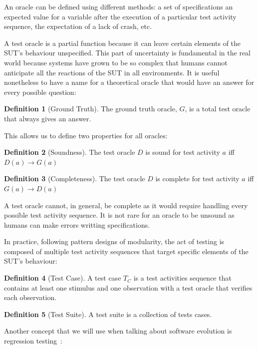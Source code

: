 \documentclass[11pt]{sdm_internship}
\theoremstyle{definition}
\newtheorem{definition}{Definition}[section]
\begin{document}
An oracle can be defined using different methods: a set of specifications an expected value for a variable after the execution of a particular test activity sequence, the expectation of a lack of crash, etc.

A test oracle is a partial function because it can leave certain elements of the SUT's behaviour unspecified.
This part of uncertainty is fundamental in the real world because systems have grown to be so complex that humans cannot anticipate all the reactions of the SUT in all environments.
It is useful nonetheless to have a name for a theoretical oracle that would have an answer for every possible question:

\begin{definition}[Ground Truth]
  The ground truth oracle, $G$, is a total test oracle that always gives an answer.
\end{definition}

This allows us to define two properties for all oracles:

\begin{definition}[Soundness]
  The test oracle $D$ is sound for test activity $a$ iff $D(a) \rightarrow G(a)$
\end{definition}
\begin{definition}[Completeness]
  The test oracle $D$ is complete for test activity $a$ iff $G(a) \rightarrow D(a)$
\end{definition}

A test oracle cannot, in general, be complete as it would require handling every possible test activity sequence.
It is not rare for an oracle to be unsound as humans can make errors writting specifications.

In practice, following pattern designs of modularity, the act of testing is composed of multiple test activity sequences that target specific elements of the SUT's behaviour:

\begin{definition}[Test Case]
  A test case $T_C$ is a test activities sequence that contains at least one stimulus and one observation with a test oracle that verifies each observation.
\end{definition}
\begin{definition}[Test Suite]
  A test suite is a collection of tests cases.
\end{definition}

Another concept that we will use when talking about software evolution is regression testing~\cite{yoo2012regression}:
\end{document}
